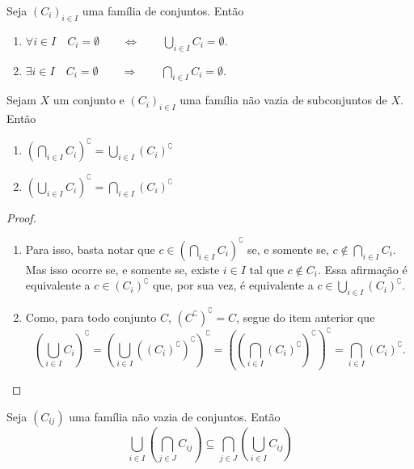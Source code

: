 \begin{prop}
	Seja $(C_i)_{i \in I}$ uma família de conjuntos. Então
	\begin{enumerate}
	\item $\forall i \in I \quad C_i = \emptyset \qquad \Leftrightarrow \qquad \displaystyle \bigcup_{i \in I} C_i = \emptyset$.
	
	\item $\displaystyle \exists i \in I \quad C_i = \emptyset \qquad \Rightarrow \qquad \bigcap_{i \in I} C_i = \emptyset$.
	\end{enumerate}
\end{prop}

\begin{prop}
Sejam $X$ um conjunto e $(C_i)_{i \in I}$ uma família não vazia de subconjuntos de $X$. Então
	\begin{enumerate}
	\item $\displaystyle \left( \bigcap_{i \in I} C_i \right)^\complement = \bigcup_{i \in I} (C_i)^\complement$
	
	\item $\displaystyle \left( \bigcup_{i \in I} C_i \right)^\complement = \bigcap_{i \in I} (C_i)^\complement$
	\end{enumerate}
\end{prop}
\begin{proof}
	\begin{enumerate}
	\item Para isso, basta notar que $c \in \left( \bigcap_{i \in I} C_i \right)^\complement$ se, e somente se, $c \notin \bigcap_{i \in I} C_i$. Mas isso ocorre se, e somente se, existe $i \in I$ tal que $c \notin C_i$. Essa afirmação é equivalente a $c \in (C_i)^\complement$ que, por sua vez, é equivalente a $ c \in \bigcup_{i \in I} (C_i)^\complement$.
	
		\item Como, para todo conjunto $C$, $(C^\complement)^\complement = C$, segue do item anterior que
		\begin{equation*}
		\displaystyle \left( \bigcup_{i \in I} C_i \right)^\complement = \left( \bigcup_{i \in I} ((C_i)^\complement)^\complement \right)^\complement = \left( \left( \bigcap_{i \in I} (C_i)^\complement \right)^\complement \right)^\complement = \bigcap_{i \in I} (C_i)^\complement.
		\end{equation*}
	\end{enumerate}
\end{proof}

\begin{prop}
Seja $(C_{ij})$ uma família não vazia de conjuntos. Então
	\begin{equation*}
	\bigcup_{i \in I} \left( \bigcap_{j \in J} C_{ij} \right) \subseteq \bigcap_{j \in J} \left( \bigcup_{i \in I} C_{ij} \right)
	\end{equation*}
\end{prop}


